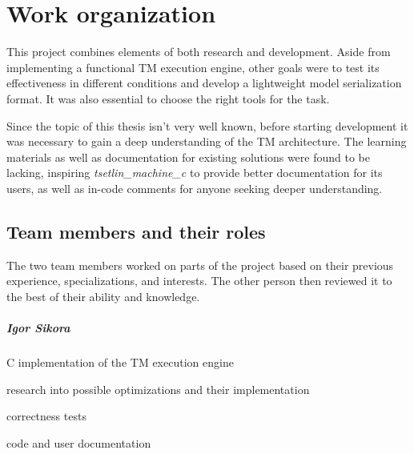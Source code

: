 \documentclass[english]{aghengthesis} %
\newcommand*{\LibraryName}{\emph{tsetlin\_machine\_c }}
\begin{document}
\chapter{Work organization}
\label{chap:work-organization}



This project combines elements of both research and development. Aside from implementing a functional TM execution engine, other goals were to test its effectiveness in different conditions and develop a lightweight model serialization format. It was also essential to choose the right tools for the task.

\par Since the topic of this thesis isn't very well known, before starting development it was necessary to gain a deep understanding of the TM architecture. The learning materials as well as documentation for existing solutions were found to be lacking, inspiring \LibraryName to provide better documentation for its users, as well as in-code comments for anyone seeking deeper understanding.

\section{Team members and their roles}

The two team members worked on parts of the project based on their previous experience, specializations, and interests. The other person then reviewed it to the best of their ability and knowledge.

\paragraph{Igor Sikora}
\begin{compactitem}
    \item C implementation of the TM execution engine
    \item research into possible optimizations and their implementation
    \item correctness tests
    \item code and user documentation
\end{compactitem}
\end{document}
